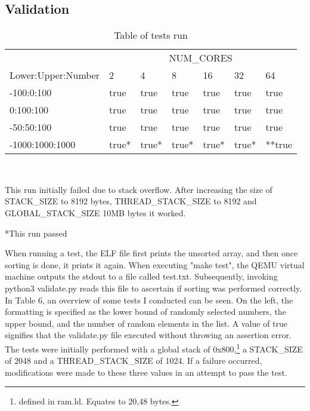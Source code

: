 \subsection{Validation}\label{sec:validate}
\begin{table}
  \caption{Table of tests run}\label{tab:tests}
  \begin{center}
    \begin{tabular}[c]{l|l|l|l|l|l|l}
      & \multicolumn{6}{c}{NUM\_CORES}\\
      \cline{2-7}
      Lower:Upper:Number & 2 & 4 & 8 & 16 & 32 & 64\\
      \hline
      -100:0:100 & true & true & true & true & true & true \\
      \hline
      0:100:100 & true & true & true & true & true & true\\
      \hline
      -50:50:100 & true & true & true & true & true & true \\
      \hline
      -1000:1000:1000 & true* & true* & true* & true* & true* & **true
    \end{tabular} \\
    \vspace{1em}
    \raggedright{\footnotesize *This run initially failed due to stack overflow. After
    increasing the size of STACK\_SIZE to 8192 bytes, THREAD\_STACK\_SIZE to
  8192 and GLOBAL\_STACK\_SIZE 10MB bytes it worked.} \\
    \raggedright{\footnotesize **This run passed }
  \end{center}
\end{table}

When running a test, the ELF file first prints the unsorted array, and then once
sorting is done, it prints it again. When executing "make test", the QEMU
virtual machine outputs the stdout to a file called test.txt. Subsequently,
invoking python3 validate.py reads this file to ascertain if sorting was
performed correctly. In Table 6, an overview of some tests I conducted can be
seen. On the left, the formatting is specified as the lower bound of randomly
selected numbers, the upper bound, and the number of random elements in the
list. A value of true signifies that the validate.py file executed without
throwing an assertion error. The tests were initially performed with a global
stack of 0x800,\footnote{defined in ram.ld. Equates to 20,48 bytes.} a
STACK\_SIZE of 2048 and a THREAD\_STACK\_SIZE of 1024. If a failure occurred,
modifications were made to these three values in an attempt to pass the test.

